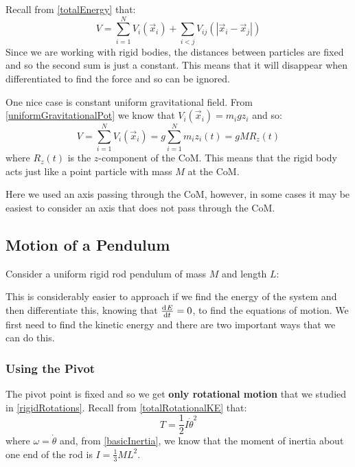 \documentclass[../main.tex]{subfiles}
\begin{document}
Recall from \cref{totalEnergy} that:
\[
  V = \sum_{i = 1}^{N}  V_i(\vec{x}_i) + \sum_{i < j} V_{ij}(|\vec{x}_i -  \vec{x}_j|)
\]
Since we are working with rigid bodies, the distances between particles are fixed and so the second sum is just a constant.
This means that it will disappear when differentiated to find the force and so can be ignored.

One nice case is constant uniform gravitational field.
From \cref{uniformGravitationalPot} we know that $V_i(\vec{x}_i) = m_i g z_i$ and so:
\begin{equation}
  V = \sum_{i = 1}^{N} V_i(\vec{x}_i) = g \sum_{i = 1}^{N} m_i z_i(t) = gMR_z(t) \label{rigidPotential}
\end{equation}
where $R_z(t)$ is the $z$-component of the CoM.
This means that the rigid body acts just like a point particle with mass $M$ at the CoM.
\begin{remark}[Note]
  Here we used an axis passing through the CoM, however, in some cases it may be easiest to consider an axis that does not pass through the CoM.
\end{remark}
\subsection{Motion of a Pendulum}
Consider a uniform rigid rod pendulum of mass $M$ and length $L$:
\begin{center}
\end{center}
This is considerably easier to approach if we find the energy of the system and then differentiate this, knowing that $\deriv{E}{t} = 0$, to find the equations of motion.
We first need to find the kinetic energy and there are two important ways that we can do this.

\subsubsection{Using the Pivot}
The pivot point is fixed and so we get \textbf{only rotational motion} that we studied in \cref{rigidRotations}.
Recall from \cref{totalRotationalKE} that:
\[
  T = \frac{1}{2}I \dot{\theta}^2
\]
where $\omega = \dot{\theta}$ and, from \cref{basicInertia}, we know that the moment of inertia about one end of the rod is $I = \frac{1}{3}ML^2$.
\end{document}
